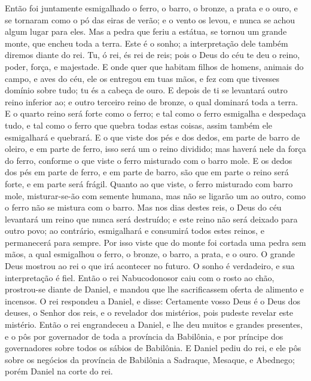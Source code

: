 {Então foi juntamente esmigalhado o ferro, o barro, o bronze, a prata e o ouro, e se tornaram como o pó das eiras de verão; e o vento os levou, e nunca se achou algum lugar para eles. Mas a pedra que feriu a estátua, se tornou um grande monte, que encheu toda a terra.
Este é o sonho; a interpretação dele também diremos diante do rei.
Tu, ó rei, és rei de reis; pois o Deus do céu te deu o reino, poder, força, e majestade.
E onde quer que habitam filhos de homens, animais do campo, e aves do céu, ele os entregou em tuas mãos, e fez com que tivesses domínio sobre tudo; tu és a cabeça de ouro.
E depois de ti se levantará outro reino inferior ao; e outro terceiro reino de bronze, o qual dominará toda a terra.
E o quarto reino será forte como o ferro; e tal como o ferro esmigalha e despedaça tudo, e tal como o ferro que quebra todas estas coisas, assim também ele esmigalhará e quebrará.
E o que viste dos pés e dos dedos, em parte de barro de oleiro, e em parte de ferro, isso será um o reino dividido; mas haverá nele
{} da força do ferro, conforme o que viste o ferro misturado com o barro mole.
E os dedos dos pés em parte de ferro, e em parte de barro, são que em parte o reino será forte, e em parte será frágil.
Quanto ao que viste, o ferro misturado com barro mole, misturar-se-ão com semente humana, mas não se ligarão um ao outro, como o ferro não se mistura com o barro.
Mas nos dias destes reis, o Deus do céu levantará um reino que nunca será destruído; e este reino não será deixado para outro povo; ao contrário, esmigalhará e consumirá todos estes reinos, e
{} permanecerá para sempre.
Por isso viste que do monte foi cortada uma pedra sem
{} mãos, a qual esmigalhou o ferro, o bronze, o barro, a prata, e o ouro. O grande Deus mostrou ao rei o que irá acontecer no futuro. O sonho é verdadeiro, e sua interpretação é fiel.
Então o rei Nabucodonosor caiu com o rosto ao chão, prostrou-se diante de Daniel, e mandou que lhe sacrificassem oferta de alimento e incensos.
O rei respondeu a Daniel, e disse: Certamente vosso Deus é o Deus dos deuses, o Senhor dos reis, e o revelador dos mistérios, pois pudeste revelar este mistério.
Então o rei engrandeceu a Daniel, e lhe deu muitos e grandes presentes, e o pôs por governador de toda a província da Babilônia, e por príncipe dos governadores sobre todos os sábios de Babilônia.
E Daniel pediu do rei, e ele pôs sobre os negócios da província de Babilônia a Sadraque, Mesaque, e Abednego; porém Daniel
{} na corte
 do rei.

\par }

